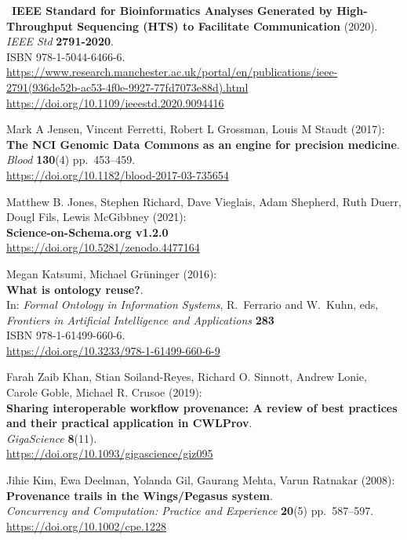 \begin{thebibliography}{9}
~\textbf{IEEE Standard for Bioinformatics Analyses Generated by
High-Throughput Sequencing (HTS) to Facilitate Communication} (2020).\\
\emph{IEEE Std} \textbf{2791-2020}.\\
ISBN 978-1-5044-6466-6.\\
\url{https://www.research.manchester.ac.uk/portal/en/publications/ieee-2791(936de52b-ac53-4f0e-9927-77fd7073e88d).html}\\
\url{https://doi.org/10.1109/ieeestd.2020.9094416}

Mark A Jensen, Vincent Ferretti, Robert L Grossman, Louis M
Staudt (2017):\\
\textbf{The NCI Genomic Data Commons as an engine for precision
medicine}.\\
\emph{Blood} \textbf{130}(4) pp.~453--459.\\
\url{https://doi.org/10.1182/blood-2017-03-735654}

Matthew B. Jones, Stephen Richard, Dave Vieglais, Adam
Shepherd, Ruth Duerr, Dougl Fils, Lewis McGibbney (2021):\\
\textbf{Science-on-Schema.org v1.2.0}\\
\url{https://doi.org/10.5281/zenodo.4477164}

Megan Katsumi, Michael Grüninger (2016):\\
\textbf{What is ontology reuse?}.\\
In: \emph{Formal Ontology in Information Systems}, R.~Ferrario and
W.~Kuhn, eds,\\
\emph{Frontiers in Artificial Intelligence and Applications}
\textbf{283}\\
ISBN 978-1-61499-660-6.\\
\url{https://doi.org/10.3233/978-1-61499-660-6-9}

Farah Zaib Khan, Stian Soiland-Reyes, Richard O. Sinnott,
Andrew Lonie, Carole Goble, Michael R. Crusoe (2019):\\
\textbf{Sharing interoperable workflow provenance: A review of best
practices and their practical application in CWLProv}.\\
\emph{GigaScience} \textbf{8}(11).\\
\url{https://doi.org/10.1093/gigascience/giz095}

Jihie Kim, Ewa Deelman, Yolanda Gil, Gaurang Mehta, Varun
Ratnakar (2008):\\
\textbf{Provenance trails in the Wings/Pegasus system}.\\
\emph{Concurrency and Computation: Practice and Experience}
\textbf{20}(5) pp.~587--597.\\
\url{https://doi.org/10.1002/cpe.1228}


\end{thebibliography}
